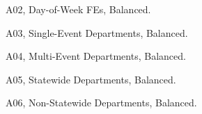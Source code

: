\documentclass[12pt,a4paper]{article}
\begin{document}
\newpage 
A02, Day-of-Week FEs, Balanced. \\ 

\begin{center}

\end{center}

\begin{center}

\end{center}



\newpage 
A03, Single-Event Departments, Balanced. \\ 

\begin{center}

\end{center}

\begin{center}

\end{center}



\newpage 
A04, Multi-Event Departments, Balanced. \\ 

\begin{center}

\end{center}

\begin{center}

\end{center}



\newpage 
A05, Statewide Departments, Balanced. \\ 

\begin{center}

\end{center}

\begin{center}

\end{center}



\newpage 
A06, Non-Statewide Departments, Balanced. \\ 

\begin{center}

\end{center}

\begin{center}

\end{center}
\end{document}
